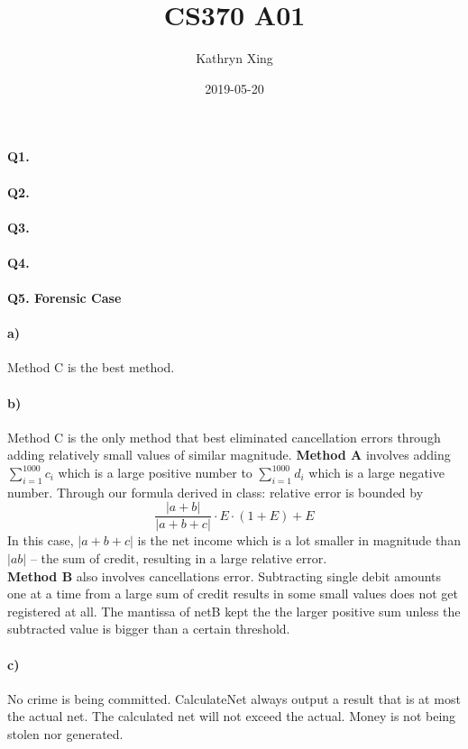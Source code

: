 \documentclass{article}
\title{CS370 A01}
\date{2019-05-20}
\author{Kathryn Xing}
\begin{document}
\paragraph{Q1.} 
\paragraph{Q2.}
\paragraph{Q3.}
\paragraph{Q4.}
\paragraph{Q5. Forensic Case }
\paragraph{a)} Method C is the best method.
\paragraph{b)} Method C is the only method that best eliminated cancellation errors through adding relatively small values of similar magnitude. \textbf{Method A} involves adding $\sum _{i = 1} ^{1000} c_i$ which is a large positive number to $\sum _{i = 1}^{1000}d_i $ which is a large negative number. Through our formula derived in class: relative error is bounded by 
$$ \frac{\big| a+b\big|}{\big| a+b+c\big|} \cdot E \cdot (1+E) + E $$
In this case, $\big| a+b+c\big| $ is the net income which is a lot smaller in magnitude than $\big| ab\big|$ -- the sum of credit, resulting in a large relative error. \\ 
\textbf{Method B} also involves cancellations error. Subtracting single debit amounts one at a time from a large sum of credit results in some small values does not get registered at all. The mantissa of netB kept the the larger positive sum unless the subtracted value is bigger than a certain threshold.
\paragraph{c)} No crime is being committed. CalculateNet always output a result that is at most the actual net. The calculated net will not exceed the actual. Money is not being stolen nor generated. 
\end{document}

